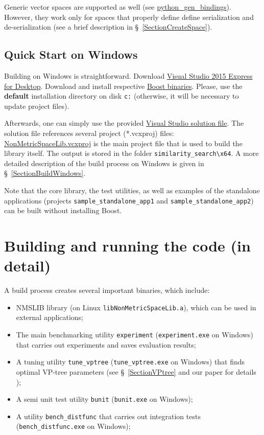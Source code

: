 \documentclass[runningheads,a4paper]{llncs}
\newcommand{\replocfile}{https://github.com/searchivarius/nmslib/blob/v1.5/}
\newcommand{\ttt}[1]{\texttt{#1}}
\begin{document}
{Generic vector spaces are supported as well (see \href{\replocfile python_gen_bindings}{python\_gen\_bindings}). However, they work only for spaces
that properly define define serialization and de-serialization (see a brief description in \S~\ref{SectionCreateSpace}).

\subsection{Quick Start on Windows}\label{QuickStartWindows}
Building on Windows is straightforward.
Download \href{https://www.visualstudio.com/en-us/downloads/download-visual-studio-vs.aspx}{Visual Studio 2015 Express for Desktop}. 
Download and install respective \href{http://sourceforge.net/projects/boost/files/boost-binaries/1.59.0/boost_1_59_0-msvc-14.0-64.exe/download}{Boost binaries}. Please, use the \textbf{default} installation directory on disk \ttt{c:} (otherwise, it will be necessary to update project files).

Afterwards, one can simply use the provided \href{\replocfile similarity_search/NonMetricSpaceLib.sln}{Visual Studio 
solution file}.
The solution file references several project (*.vcxproj) files: 
\href{\replocfile similarity_search/src/NonMetricSpaceLib.vcxproj}{NonMetricSpaceLib.vcxproj}
is the main project file that is used to build the library itself.
The output is stored in the folder \ttt{similarity\_search\textbackslash x64}.
A more detailed description of the build process on Windows is given in \S~\ref{SectionBuildWindows}.

Note that the core library, the test utilities,
 as well as examples of the standalone applications (projects \ttt{sample\_standalone\_app1}
and \ttt{sample\_standalone\_app2})
can be built without installing Boost. 


\section{Building and running the code (in detail)}

A build process creates several important binaries, which include:

\begin{itemize}
\item NMSLIB library (on Linux \ttt{libNonMetricSpaceLib.a}),
which can be used in external applications;
\item The main benchmarking utility \ttt{experiment} (\ttt{experiment.exe} on Windows) 
that carries out experiments and saves evaluation results;
\item A tuning utility \ttt{tune\_vptree} (\ttt{tune\_vptree.exe} on Windows) 
that finds optimal VP-tree parameters (see \S~\ref{SectionVPtree} and our paper for details \cite{Boytsov_and_Bilegsaikhan:nips2013});
\item A semi unit test utility \ttt{bunit} (\ttt{bunit.exe} on Windows);
\item A utility \ttt{bench\_distfunc} that carries out integration tests (\ttt{bench\_distfunc.exe} on  Windows);
\end{itemize}

}
\end{document}
